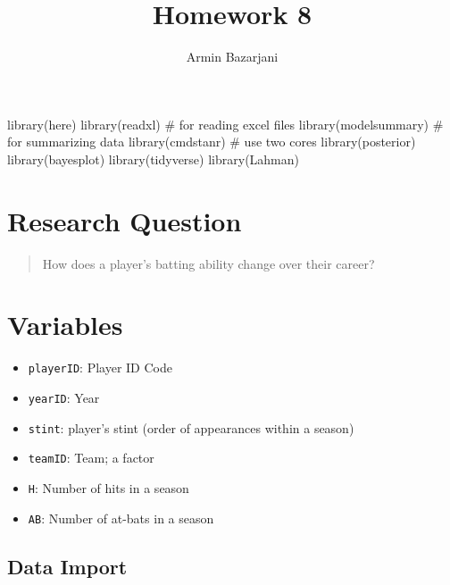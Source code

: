 \documentclass[
  letterpaper,
  DIV=11,
  numbers=noendperiod]{scrartcl}
\title{Homework 8}
\author{Armin Bazarjani}
\date{}
\newenvironment{Shaded}{\begin{snugshade}}{\end{snugshade}}
\newcommand{\CommentTok}[1]{\textcolor[rgb]{0.37,0.37,0.37}{#1}}
\newcommand{\FunctionTok}[1]{\textcolor[rgb]{0.28,0.35,0.67}{#1}}
\newcommand{\NormalTok}[1]{\textcolor[rgb]{0.00,0.23,0.31}{#1}}
\providecommand{\tightlist}{%
  \setlength{\itemsep}{0pt}\setlength{\parskip}{0pt}}\usepackage{longtable,booktabs,array}
\begin{document}
\maketitle


\begin{Shaded}
\begin{Highlighting}[]
\FunctionTok{library}\NormalTok{(here)}
\FunctionTok{library}\NormalTok{(readxl)  }\CommentTok{\# for reading excel files}
\FunctionTok{library}\NormalTok{(modelsummary)  }\CommentTok{\# for summarizing data}
\FunctionTok{library}\NormalTok{(cmdstanr)  }\CommentTok{\# use two cores}
\FunctionTok{library}\NormalTok{(posterior)}
\FunctionTok{library}\NormalTok{(bayesplot)}
\FunctionTok{library}\NormalTok{(tidyverse)}
\FunctionTok{library}\NormalTok{(Lahman)}
\end{Highlighting}
\end{Shaded}

\section{Research Question}\label{research-question}

\begin{quote}
How does a player's batting ability change over their career?
\end{quote}

\section{Variables}\label{variables}

\begin{itemize}
\tightlist
\item
  \texttt{playerID}: Player ID Code
\item
  \texttt{yearID}: Year
\item
  \texttt{stint}: player's stint (order of appearances within a season)
\item
  \texttt{teamID}: Team; a factor
\item
  \texttt{H}: Number of hits in a season
\item
  \texttt{AB}: Number of at-bats in a season
\end{itemize}

\subsection{Data Import}\label{data-import}
\end{document}
